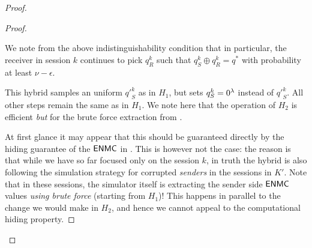 \begin{proof}
\begin{proof}
        \begin{remark}
            We note from the above indistinguishability  condition that in particular, the receiver in session $k$ continues to pick $q^k_R$ such that $q^k_S \oplus q^k_R = q^*$ with probability at least $\nu-\epsilon$. 
        \end{remark}

         This hybrid samples an uniform ${q'}^k_S$ as in $H_1$, but sets $q_S^k = 0^\lambda$ instead of ${q'}_S^k$. All other steps remain the same as in $H_1$. We note here that the operation of $H_2$ is efficient {\em but} for the brute force extraction from . 

         At first glance it may appear that this should be guaranteed directly by the hiding guarantee of the $\mathsf{ENMC}$ in . This is however not the case: the reason is that while we have so far focused only on the session $k$, in truth the hybrid is also following the simulation strategy for corrupted {\em senders} in the sessions in $K'$. Note that in these sessions, the simulator itself is extracting the sender side $\mathsf{ENMC}$ values {\em using brute force} (starting from $H_1$)! This happens in parallel to the change we would make in $H_2$, and hence we cannot appeal to the computational hiding property. 
        

\end{proof}
\end{proof}
